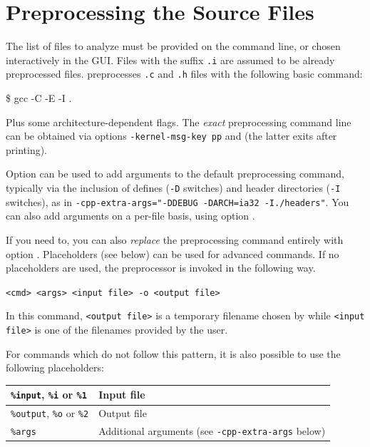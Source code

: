 \section{Preprocessing the Source Files}\label{sec:preprocessing}

The list of files to analyze must be provided on the command line, or
chosen interactively in the GUI. Files with the suffix
{\tt .i} are assumed to be already preprocessed \C files. \FramaC
preprocesses {\tt .c} and {\tt .h} files with the following basic command:
\begin{shell}
\$ gcc -C -E -I .
\end{shell}
Plus some architecture-dependent flags. The {\em exact} preprocessing command
line can be obtained via options \texttt{-kernel-msg-key pp} and
 (the latter exits \FramaC after printing).

Option  can be used to add arguments to the
default preprocessing command, typically via the inclusion of defines
(\texttt{-D} switches) and header directories (\texttt{-I} switches), as in
\texttt{-cpp-extra-args="-DDEBUG -DARCH=ia32 -I./headers"}.
You can also add arguments on a per-file basis, using option
.

If you need to, you can also {\em replace} the preprocessing command
entirely with option . Placeholders (see below)
can be used for advanced commands.
If no placeholders are used, the preprocessor is invoked in the
following way.
\begin{commands}
\texttt{<cmd> <args> <input file> -o <output file>}
\end{commands}

In this command, \texttt{<output file>} is a temporary filename chosen by
\FramaC while \texttt{<input file>} is one of the filenames provided by the
user.

For commands which do not follow this pattern, it is also possible to use
the following placeholders:

\begin{tabular}{|l|l|}
\hline
\texttt{\%input}, \texttt{\%i} or \texttt{\%1} & Input file \\
\hline
\texttt{\%output}, \texttt{\%o} or \texttt{\%2} & Output file \\
\hline
\texttt{\%args} & Additional arguments (see \texttt{-cpp-extra-args} below)\\
\hline
\end{tabular}


